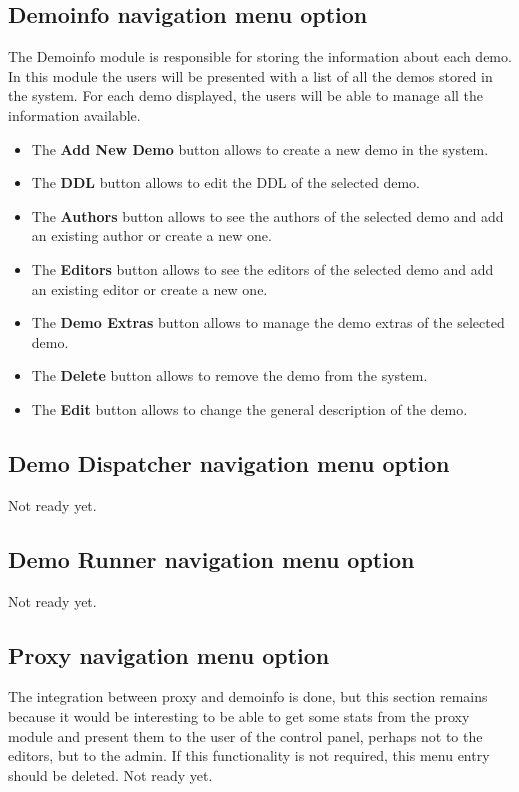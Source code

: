 \subsection{Demoinfo navigation menu option}
The Demoinfo module is responsible for storing the information about each demo.
In this module the users will be presented with a list of all the demos stored in the system. For each demo displayed, the users will be able to manage all the information available.
\begin{itemize}
\item The \textbf{Add New Demo} 
button allows to create a new demo in the system.
\item The \textbf{DDL} 
button allows to edit the DDL of the selected demo.
\item The \textbf{Authors} 
button allows to see the authors of the selected demo and add an existing author or create a new one.
\item The \textbf{Editors} 
button allows to see the editors of the selected demo and add an existing editor or create a new one.
\item The \textbf{Demo Extras} 
button allows to manage the demo extras of the selected demo.
\item The \textbf{Delete} 
button allows to remove the demo from the system.
\item The \textbf{Edit} 
button allows to change the general description of the demo.
\end{itemize}

\subsection{Demo Dispatcher navigation menu option}
Not ready yet.

\subsection{Demo Runner navigation menu option}
Not ready yet.

\subsection{Proxy navigation menu option}
The integration between proxy and demoinfo is done, but this section remains because it would be interesting to be able to get some stats from the proxy module and present them to the user of the control panel, perhaps not to the editors, but to the admin.
If this functionality is not required, this menu entry should be deleted.
Not ready yet.

